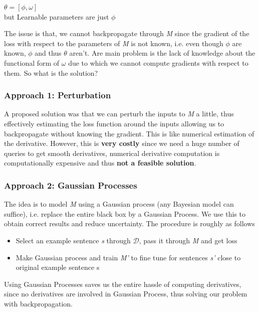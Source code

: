 \documentclass[12pt]{article}
\begin{document}
\begin{center}
    {\LARGE $\theta = \left[ \phi, \omega \right]$}\\
    {\LARGE but Learnable parameters are just $\displaystyle \phi $}
\end{center}
\vspace{1cm}

The issue is that, we cannot backpropagate through \textit{M} since the gradient of the loss with respect to the parameters of \textit{M} is not known, i.e. even though $\phi$ are known, $\phi$ and thus $\theta$ aren't. Are main problem is the lack of knowledge about the functional form of $\omega$ due to which we cannot compute gradients with respect to them. So what is the solution?

\subsubsection{Approach 1: Perturbation}
A proposed solution was that we can perturb the inputs to \textit{M} a little, thus effectively estimating the loss function around the inputs allowing us to backpropagate without knowing the gradient. This is like numerical estimation of the derivative. However, this is \textbf{very costly} since we need a huge number of queries to get smooth derivatives, numerical derivative computation is computationally expensive and thus \textbf{not a feasible solution}.

\subsubsection{Approach 2: Gaussian Processes}
The idea is to model \textit{M} using a Gaussian process (any Bayesian model can suffice), i.e. replace the entire black box by a Gaussian Process. We use this to obtain correct results and reduce uncertainty. The procedure is roughly as follows
\begin{itemize}
    \item Select an example sentence \textit{s} through $\mathcal{D}$, pass it through \textit{M} and get loss
    \item Make Gaussian process and train \textit{M'} to fine tune for sentences \textit{s'} close to original example sentence s
\end{itemize}
Using Gaussian Processes saves us the entire hassle of computing derivatives, since no derivatives are involved in Gaussian Process, thus solving our problem with backpropagation. 
\end{document}
